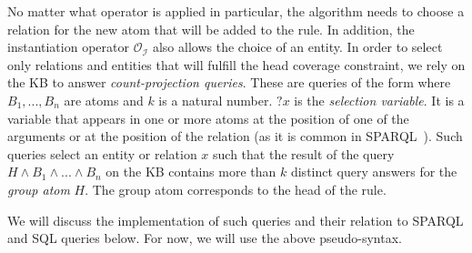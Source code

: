 No matter what operator is applied in particular, the algorithm needs to choose a relation for the new atom that will be added to the rule.
In addition, the instantiation operator $\mathcal{O_I}$ also allows the choice of an entity.
In order to select only relations and entities that will fulfill the head coverage constraint, we rely on the KB to answer \emph{count-projection queries}.
These are queries of the form
where $B_1, ..., B_n$ are atoms and $k$ is a natural number.
$?x$ is the \emph{selection variable}.
It is a variable that appears in one or more atoms at the position of one of the arguments or at the position of the relation (as it is common in SPARQL~\cite{sparql}). 
Such queries select an entity or relation $x$ such that the result of the query $H \wedge B_1 \wedge ... \wedge B_n$ on the KB contains more than $k$ distinct query answers
for the \emph{group atom} $H$. The group atom corresponds to the head of the rule.

We will discuss the implementation of such queries and their relation to SPARQL and SQL queries below. For now, we will use the above pseudo-syntax.

